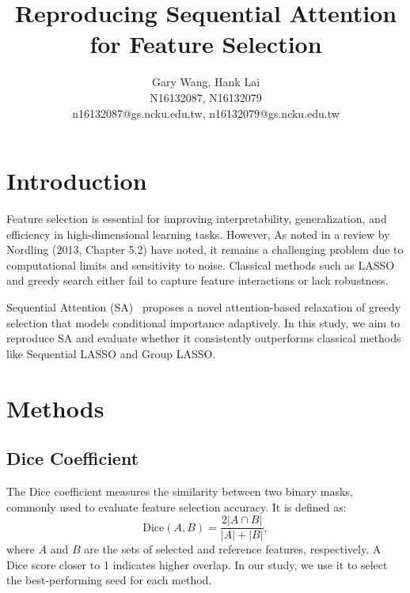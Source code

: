 \documentclass[a4paper,twocolumn]{article} %
\begin{document}

\title{Reproducing Sequential Attention for Feature Selection}
\author{Gary Wang, Hank Lai \\ N16132087, N16132079 \\ n16132087@gs.ncku.edu.tw, n16132079@gs.ncku.edu.tw} 

\maketitle                     %





\section{Introduction}

Feature selection is essential for improving interpretability, generalization, and efficiency in high-dimensional learning tasks.
 However, As noted in a review by Nordling (2013, Chapter 5.2) have noted, it remains a challenging problem due to 
computational limits and sensitivity to noise. Classical methods such as LASSO and greedy search either fail to capture feature interactions or lack robustness.

Sequential Attention (SA)~\cite{yasuda2023} proposes a novel attention-based relaxation of greedy selection that models conditional importance adaptively. 
In this study, we aim to reproduce SA and evaluate whether it consistently outperforms classical methods 
like Sequential LASSO and Group LASSO.


\section{Methods}
\subsection{Dice Coefficient}
The Dice coefficient measures the similarity between two binary masks, commonly used to evaluate feature selection accuracy. It is defined as:
\begin{equation}
    \mathrm{Dice}(A, B) = \frac{2|A \cap B|}{|A| + |B|},
\end{equation}
where $A$ and $B$ are the sets of selected and reference features, respectively. A Dice score closer to 1 indicates higher overlap. In our study, we use it to select the best-performing seed for each method.
\end{document}
